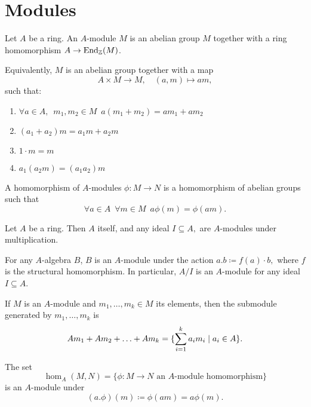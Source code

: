 \section{Modules}

\begin{df}
  Let $A$ be a ring. An $A$-module $M$ is an abelian group $M$ together with a ring homomorphism $A \to \operatorname*{End}_{\mathbb Z}(M)$.

Equivalently, $M$ is an abelian group together with a map
\[ A \times M \to M, \quad (a, m) \mapsto am, \]
such that:
\begin{enumerate}
\item $\forall a \in A, \enspace m_1, m_2 \in M \enspace a(m_1+m_2) = am_1 + am_2$
\item $(a_1 + a_2)m = a_1 m + a_2 m$
\item $1 \cdot m = m$
\item $a_1 (a_2 m) = (a_1 a_2) m$
\end{enumerate}
\end{df}

\begin{df}
  A homomorphism of $A$-modules $\phi \colon M \to N$ is a homomorphism of abelian groups such that
  \[ \forall a \in A \enspace \forall m \in M \enspace a \phi(m) = \phi(am). \]
\end{df}

\begin{example}
  Let \(A\) be a ring. Then \(A\) itself, and any ideal $I \subseteq A,$ are $A$-modules under multiplication.
\end{example}

\begin{example}
  For any $A$-algebra $B$, $B$ is an $A$-module under the action \(a.b \coloneqq f(a) \cdot b,\) where \(f\) is the structural homomorphism. In particular, $A/{I}$ is an $A$-module for any ideal $I \subseteq A$.
\end{example}

\begin{df}
  If $M$ is an $A$-module and $m_1, \ldots, m_k \in M$ its elements, then the submodule generated by $m_1, \ldots, m_k$ is
  \[ Am_1 + Am_2 + \ldots + Am_k = \{ \sum_{i=1}^k a_i m_i \mathrel{|} a_i \in A \}.\]
\end{df}

\begin{prop}
  The set
  \[ \hom_A(M, N) = \{ \phi: M \to N \text{ an $A$-module homomorphism} \} \]
  is an $A$-module under
  \[ (a.\phi)(m) \coloneqq \phi(am) = a \phi(m).\]
\end{prop}

